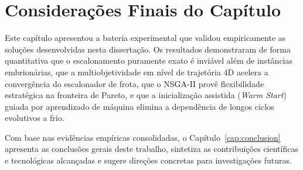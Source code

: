 \section{Considerações Finais do Capítulo}\label{sec:conclusao_cap5}

Este capítulo apresentou a bateria experimental que validou empiricamente as soluções desenvolvidas nesta dissertação. Os resultados demonstraram de forma quantitativa que o escalonamento puramente exato é inviável além de instâncias embrionárias, que a multiobjetividade em nível de trajetória 4D acelera a convergência do escalonador de frota, que o NSGA-II provê flexibilidade estratégica na fronteira de Pareto, e que a inicialização assistida (\textit{Warm Start}) guiada por aprendizado de máquina elimina a dependência de longos ciclos evolutivos a frio.

Com base nas evidências empíricas consolidadas, o Capítulo~\ref{cap:conclusion} apresenta as conclusões gerais deste trabalho, sintetiza as contribuições científicas e tecnológicas alcançadas e sugere direções concretas para investigações futuras.
